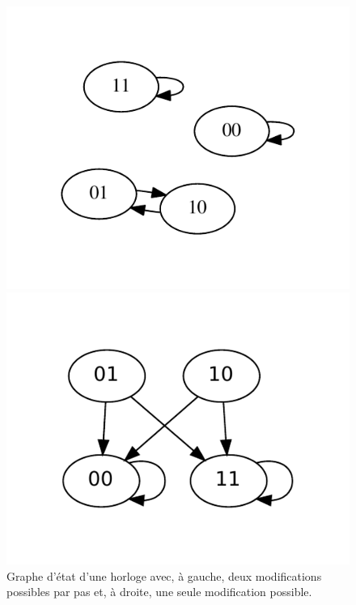 \documentclass[11pt, a4paper]{article}
\begin{document}
\begin{figure}[position]
    \begin{center}
        \begin{minipage}[c]{.49\linewidth}
            \centering
            \includegraphics[scale=0.85]{bool_net_async}
        \end{minipage}
        \hfill
        \begin{minipage}[c]{.49\linewidth}
            \centering
            \includegraphics[scale=0.85]{bool_net_sync}
        \end{minipage}
        \caption{
            \label{ex_diff_sync}
            Graphe d'état d'une horloge avec, à gauche, deux modifications
            possibles par pas et, à droite, une seule modification possible.
        }
    \end{center}
\end{figure}
\end{document}
